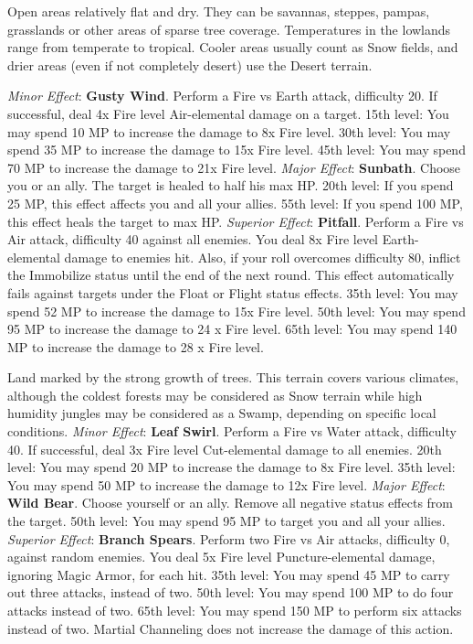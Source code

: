 \begin{multicols}{2}
    \ferrum
    Open areas relatively flat and dry. They can 
be savannas, steppes, pampas, grasslands or other
areas of sparse tree coverage. Temperatures in the 
lowlands range from temperate to tropical. Cooler 
areas usually count as Snow fields, and drier areas 
(even if not completely desert) use the Desert 
terrain.

    \textit{Minor Effect}: \textbf{Gusty Wind}. Perform a Fire 
vs Earth attack, difficulty 20. If successful, deal 4x 
Fire level Air-elemental damage on a target. 15th 
level: You may spend 10 MP to increase the 
damage to 8x Fire level. 30th level: You may spend 
35 MP to increase the damage to 15x Fire level. 
45th level: You may spend 70 MP to increase the 
damage to 21x Fire level.
    \textit{Major Effect}: \textbf{Sunbath}. Choose you or an 
ally. The target is healed to half his max HP. 20th 
level: If you spend 25 MP, this effect affects you and 
all your allies. 55th level: If you spend 100 MP, this 
effect heals the target to max HP.
    \textit{Superior Effect}: \textbf{Pitfall}. Perform a Fire vs 
Air attack, difficulty 40 against all enemies. You 
deal 8x Fire level Earth-elemental damage to 
enemies hit. Also, if your roll overcomes difficulty 
80, inflict the Immobilize status until the end of 
the next round. This effect automatically fails 
against targets under the Float or Flight status 
effects. 35th level: You may spend 52 MP to increase 
the damage to 15x Fire level. 50th level: You may 
spend 95 MP to increase the damage to 24 x Fire 
level. 65th level: You may spend 140 MP to increase 
the damage to 28 x Fire level.

\ferrum

	Land marked by the strong growth of trees. This terrain covers various climates, although the coldest forests may be considered as Snow terrain while high humidity jungles may be considered as a Swamp, depending on specific local conditions.
	\textit{Minor Effect}: \textbf{Leaf Swirl}. Perform a Fire vs Water attack, difficulty 40. If successful, deal 3x Fire level Cut-elemental damage to all enemies. 20th level: You may spend 20 MP to increase the damage to 8x Fire level. 35th level: You may spend 50 MP to increase the damage to 12x Fire level.
	\textit{Major Effect}: \textbf{Wild Bear}. Choose yourself or an ally. Remove all negative status effects from the target. 50th level: You may spend 95 MP to target you and all your allies.
	\textit{Superior Effect}: \textbf{Branch Spears}. Perform two Fire vs Air attacks, difficulty 0, against random enemies. You deal 5x Fire level Puncture-elemental damage, ignoring Magic Armor, for each hit. 35th level: You may spend 45 MP to carry out three attacks, instead of two. 50th level: You may spend 100 MP to do four attacks instead of two. 65th level: You may spend 150 MP to perform six attacks instead of two. Martial Channeling does not increase the damage of this action.


\end{multicols}
